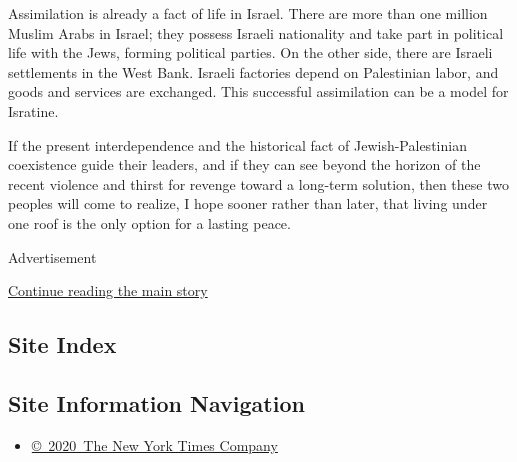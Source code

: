 Assimilation is already a fact of life in Israel. There are more than
one million Muslim Arabs in Israel; they possess Israeli nationality and
take part in political life with the Jews, forming political parties. On
the other side, there are Israeli settlements in the West Bank. Israeli
factories depend on Palestinian labor, and goods and services are
exchanged. This successful assimilation can be a model for Isratine.

If the present interdependence and the historical fact of
Jewish-Palestinian coexistence guide their leaders, and if they can see
beyond the horizon of the recent violence and thirst for revenge toward
a long-term solution, then these two peoples will come to realize, I
hope sooner rather than later, that living under one roof is the only
option for a lasting peace.

Advertisement

\protect\hyperlink{after-bottom}{Continue reading the main story}

\hypertarget{site-index}{%
\subsection{Site Index}\label{site-index}}

\hypertarget{site-information-navigation}{%
\subsection{Site Information
Navigation}\label{site-information-navigation}}

\begin{itemize}
\tightlist
\item
  \href{https://help.nytimes3xbfgragh.onion/hc/en-us/articles/115014792127-Copyright-notice}{©~2020~The
  New York Times Company}
\end{itemize}

